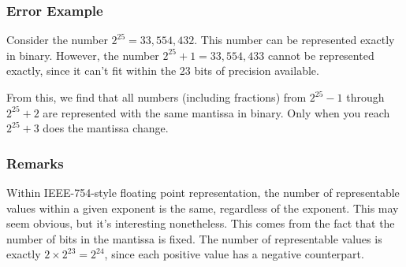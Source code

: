 
\subsubsection{Error Example}

Consider the number $2^{25} = 33,554,432$. This number can be represented 
exactly in binary. However, the number $2^{25}+1 = 33,554,433$ cannot be
represented exactly, since it can't fit within the 23 bits of precision available.

From this, we find that all numbers (including fractions) from $2^{25}-1$ 
through $2^{25}+2$ are represented with the same mantissa in binary. Only when 
you reach $2^{25}+3$ does the mantissa change.

\subsubsection{Remarks}

Within IEEE-754-style floating point representation, the
number of representable values within a given exponent is the same, regardless
of the exponent. This may seem obvious, but it's interesting nonetheless. This
comes from the fact that the number of bits in the mantissa is fixed. The
number of representable values is exactly $2\times 2^{23} = 2^{24}$, since each
positive value has a negative counterpart.

